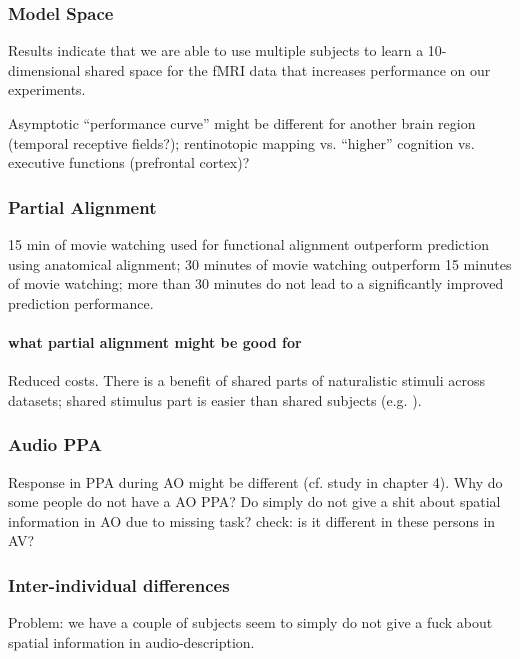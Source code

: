 \subsubsection{Model Space}
%
Results indicate that we are able to use multiple subjects to learn a
10-dimensional shared space for the fMRI data that increases performance on our
experiments.

%
Asymptotic ``performance curve'' might be different for another brain region
(temporal receptive fields?); rentinotopic mapping vs. ``higher'' cognition  vs.
executive functions (prefrontal cortex)?


\subsubsection{Partial Alignment}
%
15 min of movie watching used for functional alignment outperform prediction
using anatomical alignment;
%
30 minutes of movie watching outperform 15 minutes of movie watching;
%
more than 30 minutes do not lead to a significantly improved prediction
performance.


\paragraph{what partial alignment might be good for}
%
Reduced costs.
%
There is a benefit of shared parts of naturalistic stimuli across datasets;
shared stimulus part is easier than shared subjects (e.g.
\citep{zhang2018transfer}).


\subsubsection{Audio PPA}

%
Response in PPA during AO might be different (cf. study in chapter 4).
%
Why do some people do not have a AO PPA? Do simply do not give a shit
about spatial information in AO due to missing task?
%
check: is it different in these persons in AV?


\subsubsection{Inter-individual differences}

%
Problem: we have a couple of subjects seem to simply do not give a fuck about
spatial information in audio-description.

